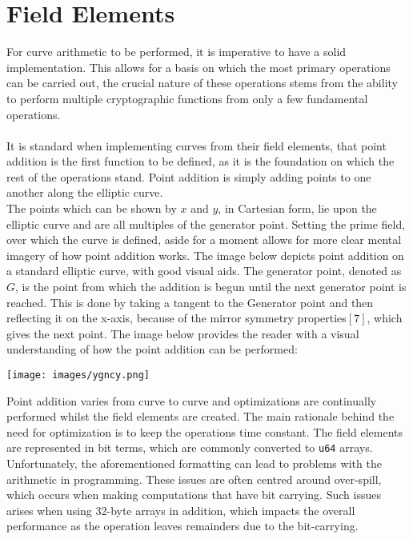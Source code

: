 \documentclass{article}
\begin{document}
\section{Field Elements}
For curve arithmetic to be performed, it is imperative to have a solid implementation. This allows for a basis on which the most primary operations can be carried out, the crucial nature of these operations stems from the ability to perform multiple cryptographic functions from only a few fundamental operations. \\\\
It is standard when implementing curves from their field elements, that point addition is the first function to be defined, as it is the foundation on which the rest of the operations stand. Point addition is simply adding points to one another along the elliptic curve.\\
The points which can be shown by $x$ and $y$, in Cartesian form, lie upon the elliptic curve and are all multiples of the generator point. Setting the prime field, over which the curve is defined, aside for a moment allows for more clear mental imagery of how point addition works. The image below depicts point addition on a standard elliptic curve, with good visual aids. The generator point, denoted as $G$, is the point from which the addition is begun until the next generator point is reached. This is done by taking a tangent to the Generator point and then reflecting it on the x-axis, because of the mirror symmetry properties$[7]$, which gives the next point. The image below provides the reader with a visual understanding of how the point addition can be performed:
\begin{center}
\texttt{[image: images/ygncy.png]}
\end{center}
Point addition varies from curve to curve and optimizations are continually performed whilst the field elements are created. The main rationale behind the need for optimization is to keep the operations time constant. The field elements are represented in bit terms, which are commonly converted to \texttt{u64} arrays. Unfortunately, the aforementioned formatting can lead to problems with the arithmetic in programming. These issues are often centred around over-spill, which occurs when making computations that have bit carrying. Such issues arises when using 32-byte arrays in addition, which impacts the overall performance as the operation leaves remainders due to the bit-carrying.\\\\
\end{document}
